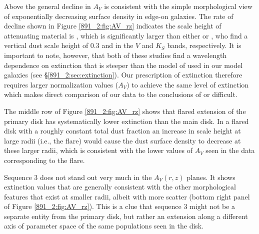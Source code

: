 
Above  the general decline in $A_V$ is consistent with
the simple morphological view of exponentially decreasing surface
density in edge-on galaxies. The rate of decline shown in Figure
\ref{891_2:fig:AV_rz} indicates the scale height of attenuating material is
, which is significantly larger than either
\citet{Xilouris99} or \citet{Schechtman-Rook12}, who find a vertical
dust scale height of 0.3 and  in the $V$ and $K_S$
bands, respectively. It is important to note, however, that both of
these studies find a wavelength dependence on extinction that is
steeper than the model of \citet{Charlot00} used in our model galaxies
(see \S\ref{891_2:sec:extinction}). Our prescription of extinction therefore
requires larger normalization values ($A_V$) to achieve the same level
of extinction which makes direct comparison of our data to the
conclusions of \citet{Xilouris99} or \citet{Schechtman-Rook12}
difficult.


The middle row of Figure \ref{891_2:fig:AV_rz} shows that flared
extension of the primary disk has systematically lower extinction than
the main disk. In a flared disk with a roughly constant total dust
fraction an increase in scale height at large radii (i.e., the flare)
would cause the dust surface density to decrease at these larger
radii, which is consistent with the lower values of $A_V$ seen in the
data corresponding to the flare.



Sequence 3 does not stand out very much in the $A_V(r,z)$ planes. It
shows extinction values that are generally consistent with the other
morphological features that exist at smaller radii, albeit with more
scatter (bottom right panel of Figure \ref{891_2:fig:AV_rz}). This is
a clue that sequence 3 might not be a separate entity from the primary
disk, but rather an extension along a different axis of parameter
space of the same populations seen in the disk.

